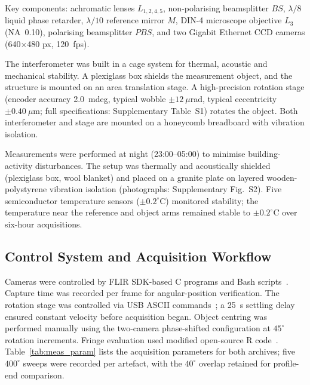 \documentclass[review]{elsarticle}
\begin{document}
Key components: achromatic lenses $L_{1,2,4,5}$, non-polarising beamsplitter $BS$, $\lambda/8$ liquid phase retarder, $\lambda/10$ reference mirror $M$, DIN-4 microscope objective $L_3$ (NA~0.10), polarising beamsplitter $PBS$, and two Gigabit Ethernet CCD cameras (640$\times$480 px, 120~fps).

The interferometer was built in a cage system for thermal, acoustic and mechanical stability. A plexiglass box shields the measurement object, and the structure is mounted on an area translation stage. A high-precision rotation stage (encoder accuracy 2.0~mdeg, typical wobble $\pm 12~\mu$rad, typical eccentricity $\pm 0.40~\mu$m; full specifications: Supplementary Table~S1) rotates the object. Both interferometer and stage are mounted on a honeycomb breadboard with vibration isolation.

Measurements were performed at night (23:00--05:00) to minimise building-activity disturbances. The setup was thermally and acoustically shielded (plexiglass box, wool blanket) and placed on a granite plate on layered wooden-polystyrene vibration isolation (photographs: Supplementary Fig.~S2). Five semiconductor temperature sensors ($\pm 0.2^\circ$C) monitored stability; the temperature near the reference and object arms remained stable to $\pm 0.2^\circ$C over six-hour acquisitions.

\subsection{Control System and Acquisition Workflow}
Cameras were controlled by FLIR SDK-based C programs and Bash scripts~\cite{FLIR_sdk}. Capture time was recorded per frame for angular-position verification. The rotation stage was controlled via USB ASCII commands~\cite{newport_esp_manual}; a 25~s settling delay ensured constant velocity before acquisition began. Object centring was performed manually using the two-camera phase-shifted configuration at $45^\circ$ rotation increments. Fringe evaluation used modified open-source R code~\cite{Meijer2018a,Ihaka1996}. Table~\ref{tab:meas_param} lists the acquisition parameters for both archives; five $400^\circ$ sweeps were recorded per artefact, with the $40^\circ$ overlap retained for profile-end comparison.
\end{document}
